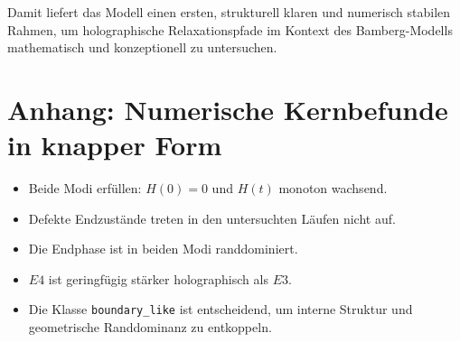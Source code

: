 \documentclass[11pt,a4paper]{article}
\theoremstyle{definition}
\theoremstyle{remark}
\begin{document}
	Damit liefert das Modell einen ersten, strukturell klaren und numerisch stabilen Rahmen, um holographische Relaxationspfade im Kontext des Bamberg-Modells mathematisch und konzeptionell zu untersuchen.
	
	\section*{Anhang: Numerische Kernbefunde in knapper Form}
	\begin{itemize}[leftmargin=2em]
		\item Beide Modi erfüllen: $H(0)=0$ und $H(t)$ monoton wachsend.
		\item Defekte Endzustände treten in den untersuchten Läufen nicht auf.
		\item Die Endphase ist in beiden Modi randdominiert.
		\item $E4$ ist geringfügig stärker holographisch als $E3$.
		\item Die Klasse \texttt{boundary\_like} ist entscheidend, um interne Struktur und geometrische Randdominanz zu entkoppeln.
	\end{itemize}
	
\end{document}
